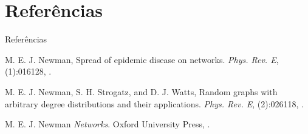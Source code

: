 \documentclass{beamer}
\theoremstyle{plain}
\theoremstyle{definition}
\begin{document}
\section{Referências}
\begin{frame}{Referências}


\begin{thebibliography}{4}

\beamertemplatearticlebibitems
{}
M. E. J. Newman,
\newblock Spread of epidemic disease on networks.
\newblock\emph{Phys. Rev. E},
(1):016128,
.

\beamertemplatearticlebibitems
{}
M. E. J. Newman, S. H. Strogatz, and D. J. Watts,
\newblock Random graphs with arbitrary degree distributions and their applications.
\newblock\emph{Phys. Rev. E},
(2):026118,
.


\beamertemplatebookbibitems
{}M. E. J. Newman \newblock\emph{Networks}.\newblock
\textlatin{Oxford University Press, }.

\end{thebibliography}
\end{frame}



\end{document}

